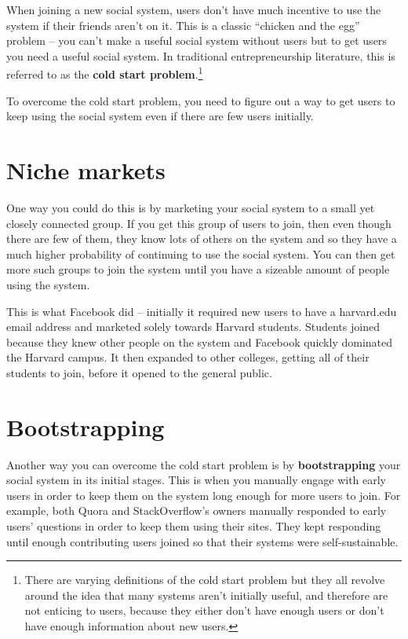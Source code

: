\documentclass[class=book, crop=false]{standalone}
\providecommand{\keyterm}[1]{\textbf{#1}\marginnote{\scriptsize \textbf{#1}}}
\begin{document}
When joining a new social system, users don’t have much incentive to use the system if their friends aren’t on it. This is a classic “chicken and the egg” problem -- you can’t make a useful social system without users but to get users you need a useful social system. In traditional entrepreneurship literature, this is referred to as the \keyterm{cold start problem}.\footnote{There are varying definitions of the cold start problem but they all revolve around the idea that many systems aren’t initially useful, and therefore are not enticing to users, because they either don’t have enough users or don’t have enough information about new users.}

To overcome the cold start problem, you need to figure out a way to get users to keep using the social system even if there are few users initially.

\section{Niche markets}

One way you could do this is by marketing your social system to a small yet closely connected group. If you get this group of users to join, then even though there are few of them, they know lots of others on the system and so they have a much higher probability of continuing to use the social system. You can then get more such groups to join the system until you have a sizeable amount of people using the system.

This is what Facebook did -- initially it required new users to have a harvard.edu email address and marketed solely towards Harvard students. Students joined because they knew other people on the system and Facebook quickly dominated the Harvard campus. It then expanded to other colleges, getting all of their students to join, before it opened to the general public.

\section{Bootstrapping}

Another way you can overcome the cold start problem is by \keyterm{bootstrapping} your social system in its initial stages. This is when you manually engage with early users in order to keep them on the system long enough for more users to join. For example, both Quora and StackOverflow’s owners manually responded to early users’ questions in order to keep them using their sites. They kept responding until enough contributing users joined so that their systems were self-sustainable.
\end{document}
